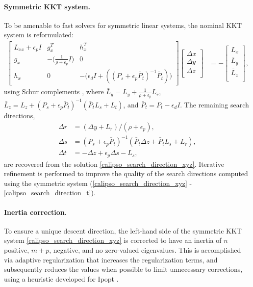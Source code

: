 \paragraph{Symmetric KKT system.}
To be amenable to fast solvers for symmetric linear systems, the nominal KKT system is reformulated:
\begin{align} 
	\begin{bmatrix} 
		L_{xx} + \epsilon_p I & g_x^T & h_x^T \\ 
		g_x & -\Big(\frac{1}{\rho + \epsilon_p} I \Big) & 0 \\ 
		h_x & 0 & -\Big(\epsilon_d I + ((P_s + \epsilon_p \bar{P}_t)^{-1} \bar{P}_t) \Big)
	\end{bmatrix} 
	\begin{bmatrix} 
		\Delta x \\ 
		\Delta y \\ 
		\Delta z \\
	\end{bmatrix} 
	&=
	-\begin{bmatrix} 
		L_x \\ 
		\bar{L}_y\\ 
		\bar{L}_z \\
	\end{bmatrix}, \label{calipso_search_direction_xyz}
\end{align} 
using Schur complements \cite{boyd2004convex}, where $\bar{L}_y = L_y + \frac{1}{\rho + \epsilon_p} L_r$, $\bar{L}_z = L_z + (P_s + \epsilon_p \bar{P}_t)^{-1}(\bar{P}_t L_s + L_t)$, and $\bar{P}_t = P_t - \epsilon_d I$. The remaining search directions,
\begin{align} 
	\Delta r &= (\Delta y + L_r) / (\rho + \epsilon_p), \label{calipso_search_direction_r}\\
	\Delta s &= (P_s + \epsilon_p \bar{P}_t)^{-1} (\bar{P}_t \Delta z + \bar{P}_t L_s + L_r), \label{calipso_search_direction_s}\\
	\Delta t &= - \Delta z + \epsilon_p \Delta s - L_s, \label{calipso_search_direction_t}
\end{align}
are recovered from the solution \eqref{calipso_search_direction_xyz}. 
Iterative refinement \cite{nocedal2006numerical} is performed to improve the quality of the search directions computed using the symmetric system (\ref{calipso_search_direction_xyz} - \ref{calipso_search_direction_t}).

\paragraph{Inertia correction.}
To ensure a unique descent direction, the left-hand side of the symmetric KKT system \eqref{calipso_search_direction_xyz} is corrected to have an inertia of $n$ positive, $m + p$, negative, and no zero-valued eigenvalues. This is accomplished via adaptive regularization that increases the regularization terms, and subsequently reduces the values when possible to limit unnecessary corrections, using a heuristic developed for Ipopt \cite{wachter2006implementation}.

